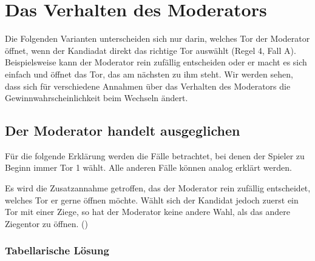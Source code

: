 \section{Das Verhalten des Moderators}

Die Folgenden Varianten unterscheiden sich nur darin, welches Tor der Moderator öffnet, wenn der Kandiadat direkt das richtige Tor auswählt (Regel 4, Fall A). Beispielsweise kann der Moderator rein zufällig entscheiden oder er macht es sich einfach und öffnet das Tor, das am nächsten zu ihm steht. Wir werden sehen, dass sich für verschiedene Annahmen über das Verhalten des Moderators die Gewinnwahrscheinlichkeit beim Wechseln ändert.


\subsection{Der Moderator handelt ausgeglichen}

Für die folgende Erklärung werden die Fälle betrachtet, bei denen der Spieler zu Beginn immer Tor 1 wählt. Alle anderen Fälle können analog erklärt werden.

Es wird die Zusatzannahme getroffen, das der Moderator rein zufällig entscheidet, welches Tor er gerne öffnen möchte. Wählt sich der Kandidat jedoch zuerst ein Tor mit einer Ziege, so hat der Moderator keine andere Wahl, als das andere Ziegentor zu öffnen. (\cite{Krauss:2003})

\subsubsection{Tabellarische Lösung}

